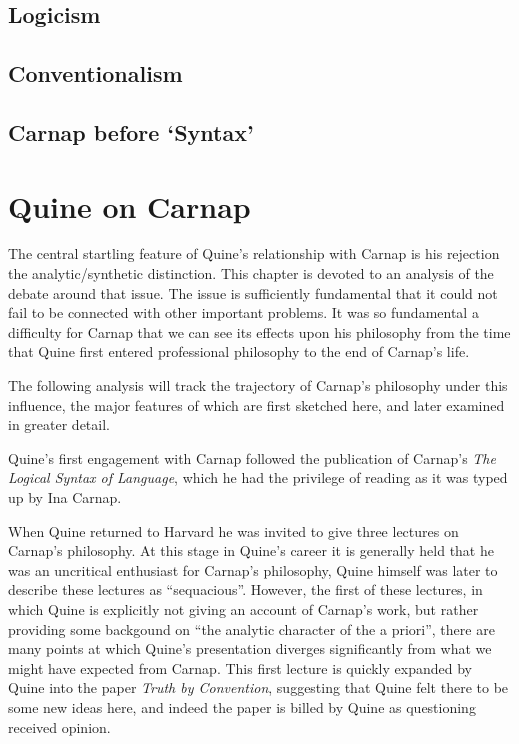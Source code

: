 \section{Logicism}

\section{Conventionalism}

\section{Carnap before `Syntax'}

\chapter{Quine on Carnap}

\nocite{carnap56,carnap63,copi67,quine53,quine61, quine61a,quine66,quine86}

The central startling feature of Quine's relationship with
Carnap is his rejection the analytic/synthetic distinction.
This chapter is devoted to an analysis of the debate around
that issue.
The issue is sufficiently fundamental that it could not fail
to be connected with other important problems.
It was so fundamental a difficulty for Carnap that we can
see its effects upon his philosophy from the time that Quine
first entered professional philosophy to the end of Carnap's
life.

The following analysis will track the trajectory of Carnap's
philosophy under this influence, the major features of which
are first sketched here, and later examined in greater detail.

Quine's first engagement with Carnap followed the publication
of Carnap's {\it The Logical Syntax of Language}\cite{carnap37},
which he had the privilege of reading as it was typed up by
Ina Carnap.

When Quine returned to Harvard he was invited to give three
lectures on Carnap's philosophy.  
At this stage in Quine's career it is generally held that
he was an uncritical enthusiast for Carnap's philosophy,
Quine himself was later to describe these lectures as ``sequacious''.
However, the first of these lectures, in which Quine is explicitly
not giving an account of Carnap's work, but rather providing some
backgound on ``the analytic character of the a priori'', there
are many points at which Quine's presentation diverges significantly
from what we might have expected from Carnap.
This first lecture is quickly expanded by Quine into the paper
{\it Truth by Convention}\cite{quine36}, suggesting that Quine
felt there to be some new ideas here, and indeed the paper is
billed by Quine as questioning received opinion.

